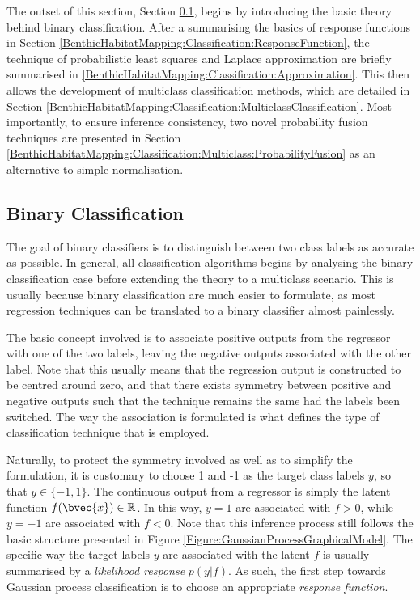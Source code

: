 		The outset of this section, Section \ref{BenthicHabitatMapping:Classification:BinaryClassification}, begins by introducing the basic theory behind binary classification. After a summarising the basics of response functions in Section \ref{BenthicHabitatMapping:Classification:ResponseFunction}, the technique of probabilistic least squares and Laplace approximation are briefly summarised in \ref{BenthicHabitatMapping:Classification:Approximation}. This then allows the development of multiclass classification methods, which are detailed in Section \ref{BenthicHabitatMapping:Classification:MulticlassClassification}. Most importantly, to ensure inference consistency, two novel probability fusion techniques are presented in Section \ref{BenthicHabitatMapping:Classification:Multiclass:ProbabilityFusion} as an alternative to simple normalisation.
		
		\subsection{Binary Classification}
		\label{BenthicHabitatMapping:Classification:BinaryClassification}
			
			The goal of binary classifiers is to distinguish between two class labels as accurate as possible. In general, all classification algorithms begins by analysing the binary classification case before extending the theory to a multiclass scenario. This is usually because binary classification are much easier to formulate, as most regression techniques can be translated to a binary classifier almost painlessly.
			
			The basic concept involved is to associate positive outputs from the regressor with one of the two labels, leaving the negative outputs associated with the other label. Note that this usually means that the regression output is constructed to be centred around zero, and that there exists symmetry between positive and negative outputs such that the technique remains the same had the labels been switched. The way the association is formulated is what defines the type of classification technique that is employed.
			
			Naturally, to protect the symmetry involved as well as to simplify the formulation, it is customary to choose 1 and -1 as the target class labels $y$, so that $y \in \{-1, 1\}$. The continuous output from a regressor is simply the latent function $f(\bvec{x}) \in \mathbb{R}$. In this way, $y = 1$ are associated with $f > 0$, while $y = -1$ are associated with $f < 0$. Note that this inference process still follows the basic structure presented in Figure \ref{Figure:GaussianProcessGraphicalModel}. The specific way the target labels $y$ are associated with the latent $f$ is usually summarised by a \textit{likelihood response} $p(y | f)$. As such, the first step towards Gaussian process classification is to choose an appropriate \textit{response function}.
			

